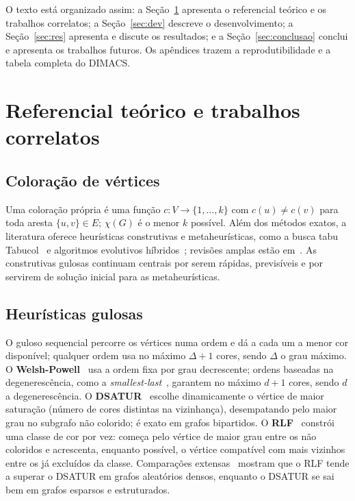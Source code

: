\documentclass[conference,a4paper]{IEEEtran}
\begin{document}
O texto está organizado assim: a Seção~\ref{sec:ref} apresenta o referencial teórico e os
trabalhos correlatos; a Seção~\ref{sec:dev} descreve o desenvolvimento; a
Seção~\ref{sec:res} apresenta e discute os resultados; e a Seção~\ref{sec:conclusao} conclui e
apresenta os trabalhos futuros. Os apêndices trazem a reprodutibilidade e a tabela completa do
DIMACS.

\section{Referencial teórico e trabalhos correlatos}\label{sec:ref}

\subsection{Coloração de vértices}
Uma coloração própria é uma função $c:V\to\{1,\dots,k\}$ com $c(u)\ne c(v)$ para toda aresta
$\{u,v\}\in E$; $\chi(G)$ é o menor $k$ possível. Além dos métodos exatos, a literatura
oferece heurísticas construtivas e metaheurísticas, como a busca tabu
Tabucol~\cite{hertz1987} e algoritmos evolutivos híbridos~\cite{galinier1999}; revisões
amplas estão em~\cite{malaguti2010,lewis2021}. As construtivas gulosas continuam centrais por
serem rápidas, previsíveis e por servirem de solução inicial para as metaheurísticas.

\subsection{Heurísticas gulosas}
O guloso sequencial percorre os vértices numa ordem e dá a cada um a menor cor disponível;
qualquer ordem usa no máximo $\Delta+1$ cores, sendo $\Delta$ o grau máximo. O
\textbf{Welsh-Powell}~\cite{welsh1967} usa a ordem fixa por grau decrescente; ordens baseadas
na degenerescência, como a \emph{smallest-last}~\cite{matula1983}, garantem no máximo
$d+1$ cores, sendo $d$ a degenerescência. O \textbf{DSATUR}~\cite{brelaz1979} escolhe
dinamicamente o vértice de maior saturação (número de cores distintas na vizinhança),
desempatando pelo maior grau no subgrafo não colorido; é exato em grafos bipartidos. O
\textbf{RLF}~\cite{leighton1979} constrói uma classe de cor por vez: começa pelo vértice de
maior grau entre os não coloridos e acrescenta, enquanto possível, o vértice compatível com
mais vizinhos entre os já excluídos da classe. Comparações extensas~\cite{lewis2021} mostram
que o RLF tende a superar o DSATUR em grafos aleatórios densos, enquanto o DSATUR se sai bem em
grafos esparsos e estruturados.
\end{document}
